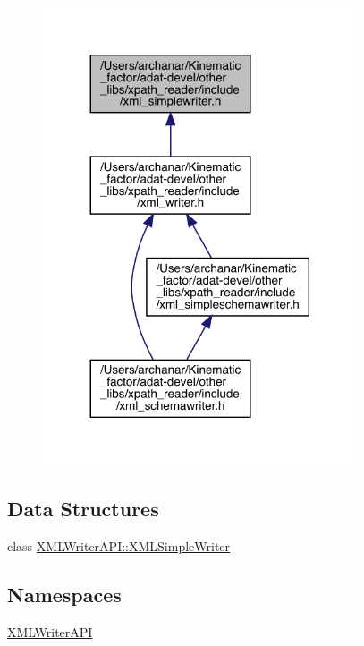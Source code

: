 \begin{figure}[H]
\begin{center}
\leavevmode
\includegraphics[width=263pt]{dd/d45/adat-devel_2other__libs_2xpath__reader_2include_2xml__simplewriter_8h__dep__incl}
\end{center}
\end{figure}
\subsection*{Data Structures}
\begin{DoxyCompactItemize}
\item 
class \mbox{\hyperlink{classXMLWriterAPI_1_1XMLSimpleWriter}{X\+M\+L\+Writer\+A\+P\+I\+::\+X\+M\+L\+Simple\+Writer}}
\end{DoxyCompactItemize}
\subsection*{Namespaces}
\begin{DoxyCompactItemize}
\item 
 \mbox{\hyperlink{namespaceXMLWriterAPI}{X\+M\+L\+Writer\+A\+PI}}
\end{DoxyCompactItemize}
